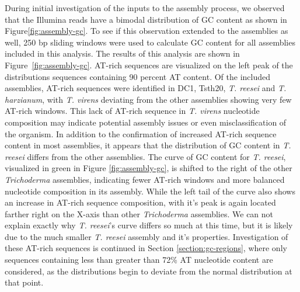 During initial investigation of the inputs to the assembly process, we
observed that the Illumina reads have a bimodal distribution of GC
content as shown in Figure\ref{fig:assembly-gc}. To see if this
observation extended to the assemblies as well, 250 bp sliding windows
were used to calculate GC content for all assemblies included in this
analysis. The results of this analysis are shown in
Figure~\ref{fig:assembly-gc}. AT-rich sequences are visualized on the
left peak of the distributions sequences containing 90 percent AT
content. Of the included assemblies, AT-rich sequences were identified
in DC1, Tsth20, \textit{T. reesei} and \textit{T. harzianum}, with
\textit{T. virens} deviating from the other assemblies showing very
few AT-rich windows. This lack of AT-rich sequence in
\textit{T. virens} nucleotide composition may indicate potential
assembly issues or even misclassification of the organism. In addition
to the confirmation of increased AT-rich sequence content in most
assemblies, it appears that the distribution of GC content in
\textit{T. reesei} differs from the other assemblies. The curve of GC
content for \textit{T. reesei}, visualized in green in Figure
\ref{fig:assembly-gc}, is shifted to the right of the other
\textit{Trichoderma} assemblies, indicating fewer AT-rich windows and
more balanced nucleotide composition in its assembly. While the left
tail of the curve also shows an increase in AT-rich sequence
composition, with it's peak is again located farther right on the
X-axis than other \textit{Trichoderma} assemblies. We can not explain
exactly why \textit{T. reesei}'s curve differs so much at this time,
but it is likely due to the much smaller \textit{T. reesei} assembly
and it's properties. Investigation of these AT-rich sequences is
continued in Section \ref{section:gc-regions}, where only sequences
containing less than greater than 72\% AT nucleotide content are
considered, as the distributions begin to deviate from the normal
distribution at that point.

